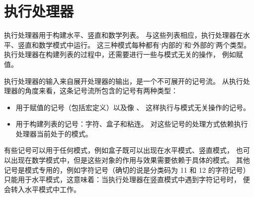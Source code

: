 \documentclass{book}
\begin{document}
\section{执行处理器}

执行处理器用于构建水平、竖直和数学列表。
与这些列表相应，执行处理器在水平、竖直和数学模式中运行。
这三种模式每种都有`内部的'和`外部的'两个类型。
执行处理器在构建列表的过程中，还需要进行一些与模式无关的操作，
例如赋值。

执行处理器的输入来自展开处理器的输出，是一个不可展开的记号流。
从执行处理器的角度来看，这条记号流所包含的记号有两种类型：
\begin{itemize}
\item 用于赋值的记号（包括宏定义）以及像 、
  这样执行与模式无关操作的记号。
\item 用于构建列表的记号：字符、盒子和粘连。
  对这些记号的处理方式依赖执行处理器当前处于的模式。
\end{itemize}

有些记号可以用于任何模式，例如盒子既可以出现在水平模式、竖直模式，
也可以出现在数学模式中，但是这些对象的作用与效果需要依赖于具体的模式。
其他记号是模式专用的，例如字符记号（确切的说是分类码为 11 和 12 的字符记号）%
只能用于水平模式，这意味着：当执行处理器在竖直模式中遇到字符记号时，
便会转入水平模式中工作。
\end{document}
